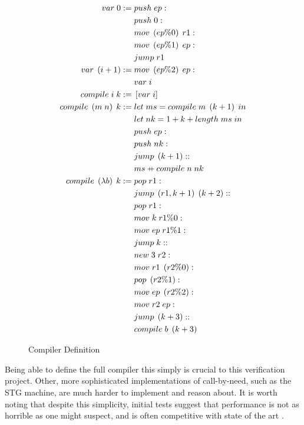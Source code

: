 \begin{figure}
\begin{align*}
var \; 0 :=  \;
  &push \; ep : \\
  &push \; 0 : \\
  &mov \; \left(ep\%0\right) \; r1 : \\
  &mov \; \left(ep\%1\right) \; ep : \\
  &jump \; r1 \\
var \; \left(i+1\right) := \;
  &mov \; \left(ep\%2\right) \; ep : \\
  &var \; i \\
compile \; i \; k := \; & \left[var \; i\right] \\
compile \; \left( m \; n \right) \; k := \;
  &let \; ms = compile \; m \; \left(k+1\right) \; in \\
  &let \; nk = 1+k+length \; ms \; in \\
  &push \; ep :  \\
  &push \; nk : \\
  &jump \; \left(k+1\right) :: \\
  &ms \concat compile \; n \; nk \\
compile \; \left(\lambda b\right) \; k := \;
  &pop \; r1 : \\
  &jump \; \left(r1, k+1 \right) \; \left(k+2\right) :: \\
  &pop \; r1 : \\
  &mov \; k \; r1\%0 : \\
  &mov \; ep \; r1\%1 : \\
  &jump \; k :: \\
  &new \; 3 \; r2 : \\
  &mov \; r1 \; \left(r2\%0\right) : \\
  &pop \; \left(r2\%1\right) : \\
  &mov \; ep \; \left(r2\%2\right) : \\
  &mov \; r2 \; ep : \\
  &jump \; \left(k+3\right) :: \\
  &compile \; b \; \left(k+3\right)
\end{align*}
\caption{Compiler Definition}
\label{fig:compiler}
\end{figure}

Being able to define the full compiler this simply is crucial to this
verification project. Other, more sophisticated implementations of call-by-need,
such as the STG machine, are much harder to implement and reason about. It is
worth noting that despite this simplicity, initial tests suggest that performance
is not as horrible as one might suspect, and is often competitive with state of
the art \cite{cem}.


